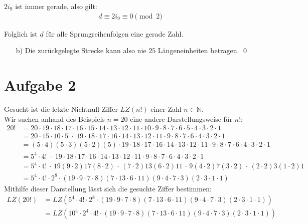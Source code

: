 \documentclass[12pt,a4paper,oneside]{article}
\DeclarePairedDelimiter{\floor}{\lfloor}{\rfloor}
\begin{document}
$2 i_9$ ist immer gerade, also gilt:
\begin{align*}
	d \equiv 2 i_9 \equiv 0 \pmod 2
\end{align*}

Folglich ist $d$ für alle Sprungreihenfolgen eine gerade Zahl.
\begin{itemize}
	\item[b)] Die zurückgelegte Strecke kann also nie $25$ Längeneinheiten betragen. \qed
\end{itemize}

\pagebreak
\section[]{Aufgabe 2}
\setlength{\mathindent}{0.5cm}

Gesucht ist die letzte Nichtnull-Ziffer $LZ(n!)$ einer Zahl $n \in \mathbb{N}$. \\
Wir suchen anhand des Beispiels $n=20$ eine andere Darstellungsweise für $n!$:
\begin{equation*}
	\begin{split}
		20! &= 20\cdot19\cdot18\cdot17\cdot16\cdot15\cdot14\cdot13\cdot12\cdot11\cdot10\cdot9\cdot8\cdot7\cdot6\cdot5\cdot4\cdot3\cdot2\cdot1 \\
		&= 20\cdot15\cdot10\cdot5 \;\cdot\; 19\cdot18\cdot17\cdot16\cdot14\cdot13\cdot12\cdot11\cdot9\cdot8\cdot7\cdot6\cdot4\cdot3\cdot2\cdot1 \\
		&= (5\cdot4)(5\cdot3)(5\cdot2)(5) \cdot 19\cdot18\cdot17\cdot16\cdot14\cdot13\cdot12\cdot11\cdot9\cdot8\cdot7\cdot6\cdot4\cdot3\cdot2\cdot1 \\
		&= 5^4 \cdot 4! \;\cdot\; 19\cdot18\cdot17\cdot16\cdot14\cdot13\cdot12\cdot11\cdot9\cdot8\cdot7\cdot6\cdot4\cdot3\cdot2\cdot1 \\
		&= 5^4 \cdot 4! \,\cdot\, 19(9\cdot2)17(8\cdot2)\,\cdot\,(7\cdot2)13(6\cdot2)11\,\cdot\,9(4\cdot2)7(3\cdot2)\,\cdot\,(2\cdot2)3(1\cdot2)1 \\
		&= 5^4 \cdot 4! \cdot 2^8 \cdot (19\cdot9\cdot7\cdot8)(7\cdot13\cdot6\cdot11)(9\cdot4\cdot7\cdot3)(2\cdot3\cdot1\cdot1)
	\end{split}
\end{equation*}
Mithilfe dieser Darstellung lässt sich die gesuchte Ziffer bestimmen:
\begin{equation*}
	\begin{split}	
		LZ(20!) &= LZ\left(5^4 \cdot 4! \cdot 2^8 \cdot (19\cdot9\cdot7\cdot8)(7\cdot13\cdot6\cdot11)(9\cdot4\cdot7\cdot3)(2\cdot3\cdot1\cdot1)\right) \\
		&= LZ\left(10^4 \cdot 2^4 \cdot 4! \cdot (19\cdot9\cdot7\cdot8)(7\cdot13\cdot6\cdot11)(9\cdot4\cdot7\cdot3)(2\cdot3\cdot1\cdot1)\right) \\
	\end{split}
\end{equation*}
\end{document}
